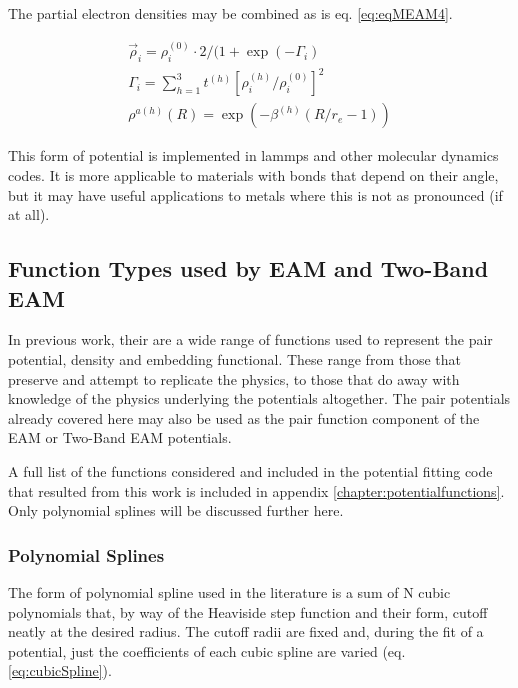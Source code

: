 The partial electron densities may be combined as is eq. \ref{eq:eqMEAM4}\cite{semiempiricalpots}.

\begin{equation}
\begin{split} 
\vec{\rho}_i = \rho_i^{(0)} \cdot 2 / (1 + \exp(-\Gamma_i) \\
\Gamma_i = \sum_{h=1}^3 t^{(h)} \left[ \rho_i^{(h)} / \rho_i^{(0)} \right]^2 \\
\rho^{a(h)}(R) = \exp(-\beta^{(h)} (R/r_e - 1)) 
\end{split}
\label{eq:eqMEAM4}
\end{equation}

This form of potential is implemented in \acrshort{lammps} and other molecular dynamics codes.  It is more applicable to materials with bonds that depend on their angle, but it may have useful applications to metals where this is not as pronounced (if at all).


\subsection{Function Types used by EAM and Two-Band EAM}

In previous work, their are a wide range of functions used to represent the pair potential, density and embedding functional.  These range from those that preserve and attempt to replicate the physics, to those that do away with knowledge of the physics underlying the potentials altogether.  The pair potentials already covered here may also be used as the pair function component of the EAM or Two-Band EAM potentials.

A full list of the functions considered and included in the potential fitting code that resulted from this work is included in appendix \ref{chapter:potentialfunctions}.  Only polynomial splines will be discussed further here.



\subsubsection{Polynomial Splines}
\label{section:backgroundpolynomialsplines}

The form of polynomial spline used in the literature is a sum of N cubic polynomials that, by way of the Heaviside step function and their form, cutoff neatly at the desired radius.  The cutoff radii are fixed and, during the fit of a potential, just the coefficients of each cubic spline are varied (eq. \ref{eq:cubicSpline}).

